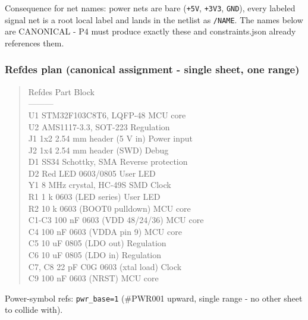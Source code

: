 \documentclass[11pt,a4paper]{article}
\begin{document}
Consequence for net names: power nets are bare (\texttt{+5V}, \texttt{+3V3}, \texttt{GND}), every labeled signal net is a root local label and lands in the netlist as \texttt{/NAME}. The names below are CANONICAL - P4 must produce exactly these and constraints.json already references them.

\subsubsection*{Refdes plan (canonical assignment - single sheet, one range)}
\begin{quote}\small\ttfamily\raggedright
\textbar{} Refdes \textbar{} Part \textbar{} Block \textbar{}\\
\textbar{}---\textbar{}---\textbar{}---\textbar{}\\
\textbar{} U1 \textbar{} STM32F103C8T6, LQFP-48 \textbar{} MCU core \textbar{}\\
\textbar{} U2 \textbar{} AMS1117-3.3, SOT-223 \textbar{} Regulation \textbar{}\\
\textbar{} J1 \textbar{} 1x2 2.54 mm header (5 V in) \textbar{} Power input \textbar{}\\
\textbar{} J2 \textbar{} 1x4 2.54 mm header (SWD) \textbar{} Debug \textbar{}\\
\textbar{} D1 \textbar{} SS34 Schottky, SMA \textbar{} Reverse protection \textbar{}\\
\textbar{} D2 \textbar{} Red LED 0603/0805 \textbar{} User LED \textbar{}\\
\textbar{} Y1 \textbar{} 8 MHz crystal, HC-49S SMD \textbar{} Clock \textbar{}\\
\textbar{} R1 \textbar{} 1 k 0603 (LED series) \textbar{} User LED \textbar{}\\
\textbar{} R2 \textbar{} 10 k 0603 (BOOT0 pulldown) \textbar{} MCU core \textbar{}\\
\textbar{} C1-C3 \textbar{} 100 nF 0603 (VDD 48/24/36) \textbar{} MCU core \textbar{}\\
\textbar{} C4 \textbar{} 100 nF 0603 (VDDA pin 9) \textbar{} MCU core \textbar{}\\
\textbar{} C5 \textbar{} 10 uF 0805 (LDO out) \textbar{} Regulation \textbar{}\\
\textbar{} C6 \textbar{} 10 uF 0805 (LDO in) \textbar{} Regulation \textbar{}\\
\textbar{} C7, C8 \textbar{} 22 pF C0G 0603 (xtal load) \textbar{} Clock \textbar{}\\
\textbar{} C9 \textbar{} 100 nF 0603 (NRST) \textbar{} MCU core \textbar{}
\end{quote}
Power-symbol refs: \texttt{pwr\_base=1} (\#PWR001 upward, single range - no other sheet to collide with).
\end{document}
